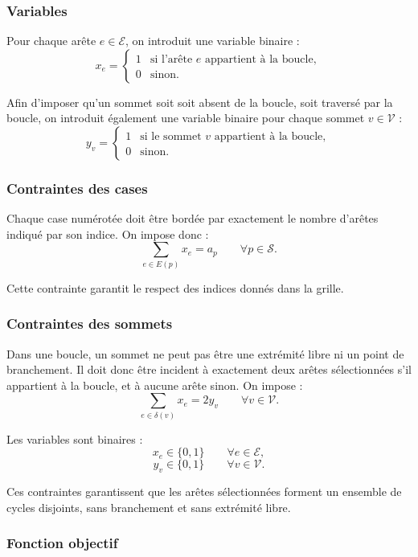 \subsubsection{Variables}

Pour chaque arête \(e \in \mathcal{E}\), on introduit une variable binaire :
\[
x_e =
\begin{cases}
1 & \text{si l'arête } e \text{ appartient à la boucle},\\
0 & \text{sinon}.
\end{cases}
\]

Afin d'imposer qu'un sommet soit soit absent de la boucle, soit traversé par la boucle, on introduit également une variable binaire pour chaque sommet \(v \in \mathcal{V}\) :
\[
y_v =
\begin{cases}
1 & \text{si le sommet } v \text{ appartient à la boucle},\\
0 & \text{sinon}.
\end{cases}
\]

\subsubsection{Contraintes des cases}

Chaque case numérotée doit être bordée par exactement le nombre d'arêtes indiqué par son indice. On impose donc :
\[
\sum_{e \in E(p)} x_e = a_p
\qquad \forall p \in \mathcal{S}.
\]

Cette contrainte garantit le respect des indices donnés dans la grille.

\subsubsection{Contraintes des sommets}

Dans une boucle, un sommet ne peut pas être une extrémité libre ni un point de branchement. Il doit donc être incident à exactement deux arêtes sélectionnées s'il appartient à la boucle, et à aucune arête sinon. On impose :
\[
\sum_{e \in \delta(v)} x_e = 2y_v
\qquad \forall v \in \mathcal{V}.
\]

Les variables sont binaires :
\[
x_e \in \{0,1\}
\qquad \forall e \in \mathcal{E},
\]
\[
y_v \in \{0,1\}
\qquad \forall v \in \mathcal{V}.
\]

Ces contraintes garantissent que les arêtes sélectionnées forment un ensemble de cycles disjoints, sans branchement et sans extrémité libre.

\subsubsection{Fonction objectif}

